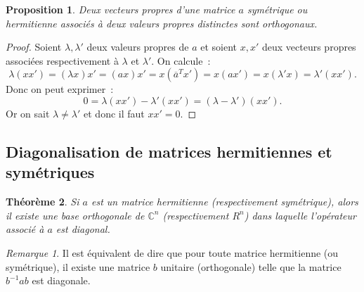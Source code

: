 \documentclass{article}
\newcommand{\C}{\mathbb C}
\newcommand{\conj}[1]{\overline {#1}}
\newtheorem{thm}{Théorème}[section]
\newtheorem{prp}[thm]{Proposition}
\theoremstyle{definition}
\theoremstyle{remark}
\newtheorem*{rmq}{Remarque}
\begin{document}
		\begin{prp} Deux vecteurs propres d'une matrice $a$ symétrique ou hermitienne associés à deux valeurs propres distinctes sont orthogonaux.
		\end{prp}

		\begin{proof} Soient $\lambda, \lambda'$ deux valeurs propres de $a$ et soient $x, x'$ deux vecteurs propres associées respectivement à $\lambda$ et
		$\lambda'$. On calcule~:
		\[\lambda (xx') = (\lambda x)x' = (ax)x' = x(\conj a^Tx') = x(ax') = x(\lambda' x) = \lambda'(xx').\]
		Donc on peut exprimer~:
		\[0 = \lambda (xx') - \lambda'(xx') = (\lambda-\lambda')(xx').\]
		Or on sait $\lambda \neq \lambda'$ et donc il faut $xx' = 0$.
		\end{proof}

	\subsection{Diagonalisation de matrices hermitiennes et symétriques}
		\begin{thm}\label{thm:diagonalisationmatricesymétrique} Si $a$ est un matrice hermitienne (respectivement symétrique), alors il existe une base
		orthogonale de $\C^n$ (respectivement $R^n$) dans laquelle l'opérateur associé à $a$ est diagonal.
		\end{thm}

		\begin{rmq} Il est équivalent de dire que pour toute matrice hermitienne (ou symétrique), il existe une matrice $b$ unitaire (orthogonale) telle que
		la matrice $b^{-1}ab$ est diagonale.
		\end{rmq}
\end{document}
